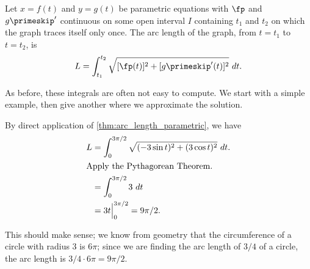 {Let $x=f(t)$ and $y=g(t)$ be parametric equations with $\fp$ and $g\primeskip'$ continuous on some open interval $I$ containing $t_1$ and $t_2$ on which the graph traces itself only once. The arc length of the graph, from $t=t_1$ to $t=t_2$, is
\[L = \int_{t_1}^{t_2} \sqrt{[\fp(t)]^2+[g\primeskip'(t)]^2}\ dt.\]}

As before, these integrals are often not easy to compute. We start with a simple example, then give  another where we approximate the solution.

{By direct application of \autoref{thm:arc_length_parametric}, we have
\begin{align*}
L &= \int_0^{3\pi/2} \sqrt{(-3\sin t)^2 +(3\cos t)^2} \ dt.\\
\intertext{Apply the Pythagorean Theorem.}
	&= \int_0^{3\pi/2} 3 \ dt\\
	&= 3t\Big|_0^{3\pi/2} = 9\pi/2.
	\end{align*}
	
This should make sense; we know from geometry that the circumference of a circle with radius 3 is $6\pi$; since we are finding the arc length of $3/4$ of a circle, the arc length is $3/4\cdot 6\pi = 9\pi/2$.}

